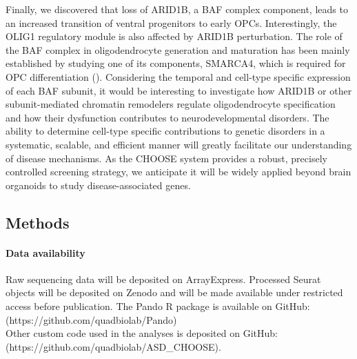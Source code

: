 Finally, we discovered that loss of ARID1B, a BAF complex component, leads to an increased transition of ventral progenitors to early OPCs.  Interestingly, the OLIG1 regulatory module is also affected by ARID1B perturbation. The role of the BAF complex in oligodendrocyte generation and maturation has been mainly established by studying one of its components, SMARCA4, which is required for OPC differentiation (\cite{yu_olig2_2013}). Considering the temporal and cell-type specific expression of each BAF subunit, it would be interesting to investigate how ARID1B or other subunit-mediated chromatin remodelers regulate oligodendrocyte specification and how their dysfunction contributes to neurodevelopmental disorders.
The ability to determine cell-type specific contributions to genetic disorders in a systematic, scalable, and efficient manner will greatly facilitate our understanding of disease mechanisms. As the CHOOSE system provides a robust, precisely controlled screening strategy, we anticipate it will be widely applied beyond brain organoids to study disease-associated genes. 


\subsection{Methods}

\paragraph{Data availability}
Raw sequencing data will be deposited on ArrayExpress. Processed Seurat objects will be deposited on Zenodo and will be made available under restricted access before publication. The Pando R package is available on GitHub: \\
(https://github.com/quadbiolab/Pando) \\
Other custom code used in the analyses is deposited on GitHub: \\ 
(https://github.com/quadbiolab/ASD\_CHOOSE).

